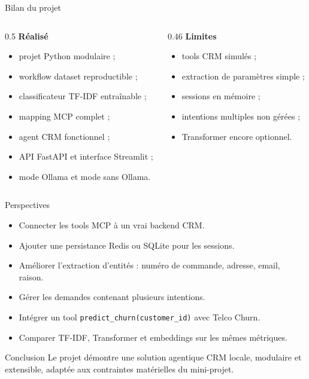\documentclass[aspectratio=169,10pt]{beamer}
\begin{document}
\begin{frame}{Bilan du projet}
    \begin{columns}[T]
        \begin{column}{0.5\textwidth}
            \textbf{Réalisé}
            \begin{itemize}
                \item projet Python modulaire ;
                \item workflow dataset reproductible ;
                \item classificateur TF-IDF entraînable ;
                \item mapping MCP complet ;
                \item agent CRM fonctionnel ;
                \item API FastAPI et interface Streamlit ;
                \item mode Ollama et mode sans Ollama.
            \end{itemize}
        \end{column}
        \begin{column}{0.46\textwidth}
            \textbf{Limites}
            \begin{itemize}
                \item tools CRM simulés ;
                \item extraction de paramètres simple ;
                \item sessions en mémoire ;
                \item intentions multiples non gérées ;
                \item Transformer encore optionnel.
            \end{itemize}
        \end{column}
    \end{columns}
\end{frame}

\begin{frame}{Perspectives}
    \begin{itemize}
        \item Connecter les tools MCP à un vrai backend CRM.
        \item Ajouter une persistance Redis ou SQLite pour les sessions.
        \item Améliorer l'extraction d'entités : numéro de commande, adresse, email, raison.
        \item Gérer les demandes contenant plusieurs intentions.
        \item Intégrer un tool \texttt{predict\_churn(customer\_id)} avec Telco Churn.
        \item Comparer TF-IDF, Transformer et embeddings sur les mêmes métriques.
    \end{itemize}

    \vspace{0.3cm}
    \begin{block}{Conclusion}
        Le projet démontre une solution agentique CRM locale, modulaire et extensible, adaptée aux contraintes matérielles du mini-projet.
    \end{block}
\end{frame}
\end{document}
